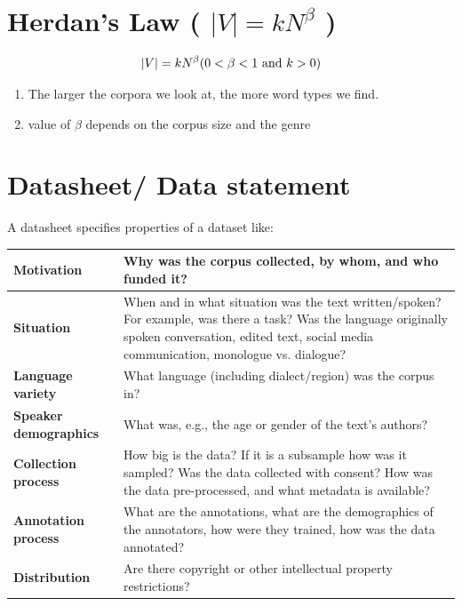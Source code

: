 \section{Herdan’s Law ( $|V| = kN^{\beta}$ ) \cite{nlp-1}} \label{Herdan’s Law}

\[
    |V| = kN^{\beta} \hfill (0 < \beta < 1 \text{ and } k > 0)
\]

\begin{enumerate}
    \item The larger the corpora we look at, the more word types we find.
    \item value of $\beta$ depends on the corpus size and the genre
\end{enumerate}

\section{Datasheet/ Data statement}\label{Datasheet/ Data statement}

A datasheet specifies properties of a dataset like:
\begin{table}[h]
    \centering
    \begin{tabular}{|m{3.5cm}|m{11.5cm}|}
        \hline
        
        \textbf{Motivation} & Why was the corpus collected, by whom, and who funded it?  \\ 
        \hline
         
         \textbf{Situation} & When and in what situation was the text written/spoken? For example, was there a task? Was the language originally spoken conversation, edited text, social media communication, monologue vs. dialogue? \\
         \hline
         
        \textbf{Language variety} & What language (including dialect/region) was the corpus in? \\
        \hline
        
        \textbf{Speaker demographics} & What was, e.g., the age or gender of the text’s authors? \\
        \hline
        
        \textbf{Collection process} & How big is the data? If it is a subsample how was it sampled? Was the data collected with consent? How was the data pre-processed, and what metadata is available? \\
        \hline

        \textbf{Annotation process} & What are the annotations, what are the demographics of the annotators, how were they trained, how was the data annotated? \\ 
        \hline

        \textbf{Distribution} & Are there copyright or other intellectual property restrictions?\\
        \hline
        
    \end{tabular}
\end{table}


